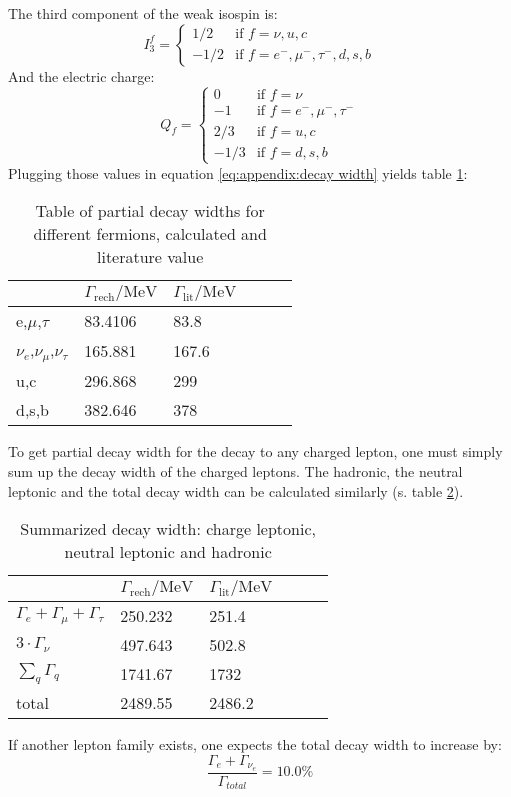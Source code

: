 The third component of the weak isospin is:
\begin{equation}
I^f_3 = \begin{cases}
1/2 & \text{if } f = \nu,u,c\\
-1/2 & \text{if } f = e^-,\mu^-,\tau^-,d,s,b
\end{cases}
\end{equation}
And the electric charge:
\begin{equation}
Q_f = \begin{cases}
0 & \text{if } f = \nu\\
-1 & \text{if } f = e^-,\mu^-,\tau^-\\
2/3 & \text{if } f = u,c\\
-1/3 & \text{if } f = d,s,b
\end{cases}
\end{equation}
Plugging those values in equation \ref{eq:appendix:decay width} yields table \ref{tb:appendix:decay widths}:

\begin{table}[H]\centering
	\begin{tabular}{@{}llllll@{}}
		\toprule
		 & $\Gamma _{\text{rech}}\text{/MeV}$ & $\Gamma
		 _{\text{lit}}\text{/MeV}$ \\
		 \midrule
		 e,$\mu $,$\tau $ & 83.4106 & 83.8 \\
		 $\nu _e$,$\nu _{\mu }$,$\nu _{\tau }$ & 165.881 & 167.6 \\
		 u,c & 296.868 & 299 \\
		 d,s,b & 382.646 & 378 \\
		 \bottomrule
	\end{tabular}
	\caption[Partial decay widths]{Table of partial decay widths for different fermions, calculated and literature value\cite{muenchen}}
	\label{tb:appendix:decay widths}
\end{table}
To get partial decay width for the decay to any charged lepton, one must simply sum up the decay width of the charged leptons. The hadronic, the neutral leptonic and the total decay width can be calculated similarly (s. table \ref{tb:appendix:summarized decay widths}).
\begin{table}[H]\centering
	\begin{tabular}{@{}llllll@{}}
		\toprule
		& $\Gamma _{\text{rech}}\text{/MeV}$ & $\Gamma
		_{\text{lit}}\text{/MeV}$ \\
		\midrule
		$\Gamma_e+\Gamma_{\mu}+\Gamma_{\tau}$ & 250.232 & 251.4 \\
		$3\cdot \Gamma_{\nu}$ & 497.643 & 502.8 \\
		$\sum_q\Gamma_q$ & 1741.67 & 1732 \\
		total & 2489.55 & 2486.2 \\
		\bottomrule
	\end{tabular}
	\caption[Summarized decay widths]{Summarized decay width: charge leptonic, neutral leptonic and hadronic}
	\label{tb:appendix:summarized decay widths}
\end{table}
If another lepton family exists, one expects the total decay width to increase by:
\begin{equation}
\frac{\Gamma_e + \Gamma_{\nu_e}}{\Gamma_{total}}=10.0 \%
\end{equation}
